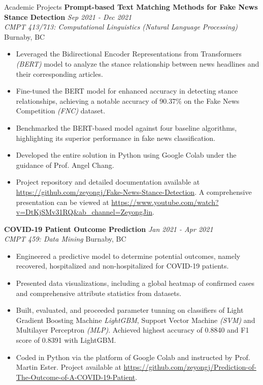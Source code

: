 \documentclass{resume} %
\begin{document}
\begin{rSection}{Academic Projects}
{\bf Prompt-based Text Matching Methods for Fake News Stance Detection} \hfill {\em Sep 2021 - Dec 2021} 
\\{\textit{CMPT 413/713: Computational Linguistics (Natural Language Processing)} \hfill {Burnaby, BC}}
\begin{itemize}
    \vspace{-0.2cm} \item Leveraged the Bidirectional Encoder Representations from Transformers \textit{(BERT)} model to analyze the stance relationship between news headlines and their corresponding articles.
    \vspace{-0.2cm} \item Fine-tuned the BERT model for enhanced accuracy in detecting stance relationships, achieving a notable accuracy of 90.37\% on the Fake News Competition \textit{(FNC)} dataset.
    \vspace{-0.2cm} \item Benchmarked the BERT-based model against four baseline algorithms, highlighting its superior performance in fake news classification.
    \vspace{-0.2cm} \item Developed the entire solution in Python using Google Colab under the guidance of Prof. Angel Chang.
    \vspace{-0.2cm} \item Project repository and detailed documentation available at \url{https://github.com/zeyongj/Fake-News-Stance-Detection}. A comprehensive presentation can be viewed at \url{https://www.youtube.com/watch?v=DtKjSMv31RQ&ab_channel=ZeyongJin}.
\end{itemize}



{\bf COVID-19 Patient Outcome Prediction} \hfill {\em Jan 2021 - Apr 2021} 
\\{\textit{CMPT 459: Data Mining} \hfill {Burnaby, BC}}
\begin{itemize}
    \vspace{-0.2cm}\item Engineered a predictive model to determine potential outcomes, namely recovered, hospitalized and non-hospitalized for COVID-19 patients.
    \vspace{-0.2cm}\item Presented data visualizations, including a global heatmap of confirmed cases and comprehensive attribute statistics from datasets.
    \vspace{-0.2cm}\item Built, evaluated, and proceeded parameter tunning on classifiers of Light Gradient Boosting Machine \textit{LightGBM}, Support Vector Machine \textit{(SVM)} and Multilayer Perceptron \textit{(MLP)}. Achieved highest accuracy of 0.8840 and F1 score of 0.8391 with LightGBM.
    \vspace{-0.2cm}\item Coded in Python via the platform of Google Colab and instructed by Prof. Martin Ester. Project available at \url{https://github.com/zeyongj/Prediction-of-The-Outcome-of-A-COVID-19-Patient}.
\end{itemize}


\end{rSection}
\end{document}
